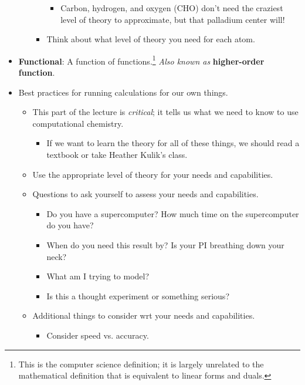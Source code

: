 \documentclass[../notes.tex]{subfiles}
\begin{document}
\begin{itemize}
\begin{itemize}
\begin{itemize}
            \begin{itemize}
                \item Carbon, hydrogen, and oxygen (CHO) don't need the craziest level of theory to approximate, but that palladium center will!
            \end{itemize}
            \item Think about what level of theory you need for each atom.
        \end{itemize}
    \end{itemize}
    \item \textbf{Functional}: A function of functions.\footnote{This is the computer science definition; it is largely unrelated to the mathematical definition that is equivalent to linear forms and duals.} \emph{Also known as} \textbf{higher-order function}.
    \item Best practices for running calculations for our own things.
    \begin{itemize}
        \item This part of the lecture is \emph{critical}; it tells us what we need to know to use computational chemistry.
        \begin{itemize}
            \item If we want to learn the theory for all of these things, we should read a textbook or take Heather Kulik's class.
        \end{itemize}
        \item Use the appropriate level of theory for your needs and capabilities.
        \item Questions to ask yourself to assess your needs and capabilities.
        \begin{itemize}
            \item Do you have a supercomputer? How much time on the supercomputer do you have?
            \item When do you need this result by? Is your PI breathing down your neck?
            \item What am I trying to model?
            \item Is this a thought experiment or something serious?
        \end{itemize}
        \item Additional things to consider wrt your needs and capabilities.
        \begin{itemize}
            \item Consider speed vs. accuracy.
            \begin{itemize}

\end{itemize}
\end{itemize}
\end{itemize}
\end{itemize}
\end{document}
